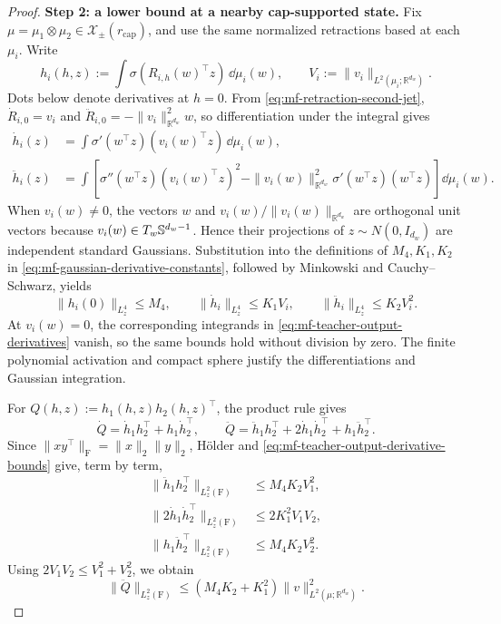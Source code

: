 \begin{proof}
\par\noindent\textbf{Step 2: a lower bound at a nearby cap-supported state.}
Fix \(\mu=\mu_1\otimes\mu_2\in\mathcal X_\pm(r_{\mathrm{cap}})\), and use the
same normalized retractions based at each \(\mu_i\). Write
\[
 h_i(h,z):=\int\sigma(R_{i,h}(w)^\top z)\,\dd\mu_i(w),
 \qquad
 V_i:=\|v_i\|_{L^2(\mu_i;\mathbb R^{d_w})}.
\]
Dots below denote derivatives at \(h=0\). From
\cref{eq:mf-retraction-second-jet},
\(\dot R_{i,0}=v_i\) and
\(\ddot R_{i,0}=-\|v_i\|_{\mathbb R^{d_w}}^2w\), so differentiation under
the integral gives
\begin{equation}
\label{eq:mf-teacher-output-derivatives}
\begin{aligned}
 \dot h_i(z)
 &=\int\sigma'(w^\top z)(v_i(w)^\top z)\,\dd\mu_i(w),\\
 \ddot h_i(z)
 &=\int\left[
   \sigma''(w^\top z)(v_i(w)^\top z)^2
   -\|v_i(w)\|_{\mathbb R^{d_w}}^2
      \sigma'(w^\top z)(w^\top z)
   \right]\dd\mu_i(w).
\end{aligned}
\end{equation}
When \(v_i(w)\ne0\), the vectors
\(w\) and \(v_i(w)/\|v_i(w)\|_{\mathbb R^{d_w}}\) are orthogonal unit
vectors because \(v_i(w)\in T_w\mathbb{S}^{d_w-1}\). Hence their projections
of \(z\sim N(0,I_{d_w})\) are independent standard Gaussians. Substitution
into the definitions of \(M_4,K_1,K_2\) in
\cref{eq:mf-gaussian-derivative-constants}, followed by Minkowski and
Cauchy--Schwarz, yields
\begin{equation}
\label{eq:mf-teacher-output-derivative-bounds}
 \|h_i(0)\|_{L^4_z}\le M_4,
 \qquad
 \|\dot h_i\|_{L^4_z}\le K_1V_i,
 \qquad
 \|\ddot h_i\|_{L^4_z}\le K_2V_i^2.
\end{equation}
At \(v_i(w)=0\), the corresponding integrands in
\cref{eq:mf-teacher-output-derivatives} vanish, so the same bounds hold
without division by zero. The finite polynomial activation and compact
sphere justify the differentiations and Gaussian integration.

For
\(Q(h,z):=h_1(h,z)h_2(h,z)^\top\), the product rule gives
\[
 \dot Q=\dot h_1h_2^\top+h_1\dot h_2^\top,
 \qquad
 \ddot Q=\ddot h_1h_2^\top+2\dot h_1\dot h_2^\top+h_1\ddot h_2^\top.
\]
Since \(\|xy^\top\|_{\mathrm F}=\|x\|_2\|y\|_2\), H\"older and
\cref{eq:mf-teacher-output-derivative-bounds} give, term by term,
\[
\begin{aligned}
 \|\ddot h_1h_2^\top\|_{L^2_z(\mathrm F)}&\le M_4K_2V_1^2,\\
 \|2\dot h_1\dot h_2^\top\|_{L^2_z(\mathrm F)}&\le2K_1^2V_1V_2,\\
 \|h_1\ddot h_2^\top\|_{L^2_z(\mathrm F)}&\le M_4K_2V_2^2.
\end{aligned}
\]
Using \(2V_1V_2\le V_1^2+V_2^2\), we obtain
\begin{equation}
\label{eq:mf-teacher-second-output-bound}
 \|\ddot Q\|_{L^2_z(\mathrm F)}
 \le (M_4K_2+K_1^2)
       \|v\|_{L^2(\mu;\mathbb R^{d_w})}^2.
\end{equation}


\end{proof}
